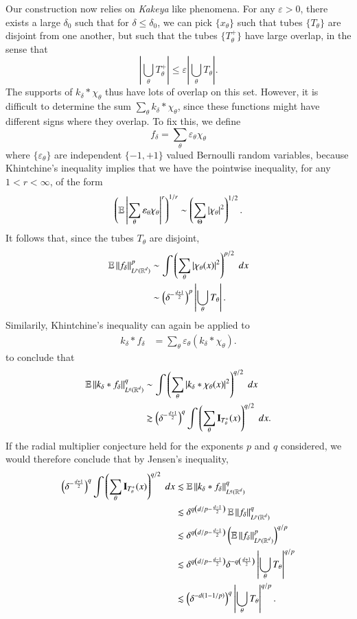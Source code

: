 Our construction now relies on \emph{Kakeya} like phenomena. For any $\varepsilon > 0$, there exists a large $\delta_0$ such that for $\delta \leq \delta_0$, we can pick $\{ x_\theta \}$ such that tubes $\{ T_\theta \}$ are disjoint from one another, but such that the tubes $\{ T_\theta^+ \}$ have large overlap, in the sense that
%
\[ | \bigcup_\theta T_\theta^+ | \leq \varepsilon | \bigcup_\theta T_\theta|. \]
%
The supports of $k_\delta * \chi_\theta$ thus have lots of overlap on this set. However, it is difficult to determine the sum $\sum_\theta k_\delta * \chi_\theta$, since these functions might have different signs where they overlap. To fix this, we define
%
\[ f_\delta = \sum_\theta \varepsilon_\theta \chi_\theta \]
%
where $\{ \varepsilon_\theta \}$ are independent $\{ -1, +1 \}$ valued Bernoulli random variables, because Khintchine's inequality implies that we have the pointwise inequality, for any $1 < r < \infty$, of the form
%
\[ \left( \operatorname{\mathbb{E}} \left| \sum_\theta \varepsilon_\theta \chi_\theta \right|^r \right)^{1/r} \sim \left( \sum_\Theta |\chi_\theta|^2 \right)^{1/2}. \]
%
It follows that, since the tubes $T_\theta$ are disjoint,
%
\begin{align*}
    \operatorname{\mathbb{E}} \| f_\delta \|_{L^p(\operatorname{\mathbb{R}}^d)}^p &\sim \int \left( \sum_\theta |\chi_\theta(x)|^2 \right)^{p/2}\; dx\\
    &\sim \left( \delta^{- \frac{d+1}{2}} \right)^p \left| \bigcup_\theta T_\theta \right|.
\end{align*}
%
Similarily, Khintchine's inequality can again be applied to
%
\begin{align*}
    k_\delta * f_\delta &= \sum_\theta \varepsilon_\theta (k_\delta * \chi_\theta).
\end{align*}
%
to conclude that
%
\begin{align*}
    \operatorname{\mathbb{E}} \| k_\delta * f_\delta \|_{L^q(\operatorname{\mathbb{R}}^d)}^q &\sim \int \left( \sum_\theta |k_\delta * \chi_\theta(x)|^2 \right)^{q/2}\; dx\\
    &\gtrsim \left( \delta^{- \frac{d+1}{2}} \right)^q \int \left( \sum_\theta \mathbf{I}_{T_\theta^+}(x) \right)^{q/2}\; dx.
\end{align*}
%
If the radial multiplier conjecture held for the exponents $p$ and $q$ considered, we would therefore conclude that by Jensen's inequality,
%
\begin{align*}
     \left( \delta^{- \frac{d+1}{2}} \right)^q \int \left( \sum_\theta \mathbf{I}_{T_\theta^+}(x) \right)^{q/2}\; dx &\lesssim \operatorname{\mathbb{E}} \| k_\delta * f_\delta \|_{L^q(\operatorname{\mathbb{R}}^d)}^q\\
     &\lesssim \delta^{q \left( d/p - \frac{d-1}{2} \right)} \operatorname{\mathbb{E}} \| f_\delta \|_{L^p(\operatorname{\mathbb{R}}^d)}^q\\
     &\lesssim \delta^{q \left( d/p - \frac{d-1}{2} \right)} \left( \operatorname{\mathbb{E}} \| f_\delta \|_{L^p(\operatorname{\mathbb{R}}^d)}^p \right)^{q/p}\\
     &\lesssim \delta^{q \left( d/p - \frac{d-1}{2} \right)} \delta^{-q \left( \frac{d+1}{2} \right)} \left| \bigcup_\theta T_\theta \right|^{q/p}\\
     &\lesssim \left( \delta^{-d(1-1/p)} \right)^q \left| \bigcup_\theta T_\theta \right|^{q/p}.
\end{align*}
